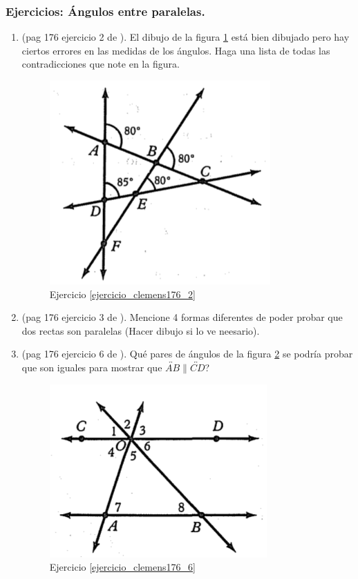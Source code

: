 \newpage
\begin{center}
	\vspace{-1cm}
	\subsubsection{Ejercicios: Ángulos entre paralelas.} \label{ejercicios_en_paralelas}
\end{center}

\begin{enumerate}
	\item \label{ejercicio_clemens176_2}(pag 176 ejercicio 2 de \cite{clemens}). El dibujo de la figura \ref{clemens176_2} está bien dibujado pero hay ciertos errores en las medidas de los ángulos. Haga una lista de todas las contradicciones que note en la figura.
	\begin{figure}[H]
		\centering
		\includegraphics[width=0.5\linewidth]{Geometria/imgs/clemens176_2}
		\caption{Ejercicio \ref{ejercicio_clemens176_2}}
		\label{clemens176_2}
	\end{figure}
	
	\item \label{ejercicio_clemens176_3}(pag 176 ejercicio 3 de \cite{clemens}). Mencione 4 formas diferentes de poder probar que dos rectas son paralelas (Hacer dibujo si lo ve neesario).
	
	\item  \label{ejercicio_clemens176_6} (pag 176 ejercicio 6 de \cite{clemens}). Qué pares de ángulos de la figura \ref{clemens176_6} se podría probar que son iguales para mostrar que $\overleftrightarrow{AB}\parallel \overleftrightarrow{CD}$?
	\begin{figure}[H]
		\centering
		\includegraphics[width=0.5\linewidth]{Geometria/imgs/clemens176_6}
		\caption{Ejercicio \ref{ejercicio_clemens176_6}}
		\label{clemens176_6}
	\end{figure}
	

\end{enumerate}
